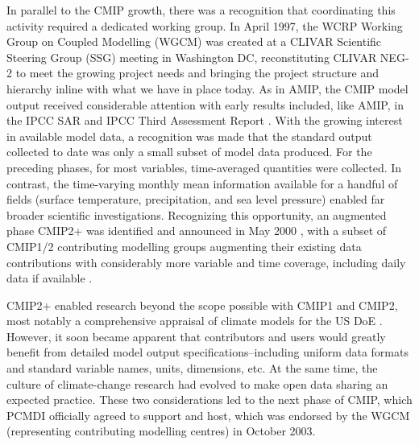 \documentclass[gmd, preprint]{copernicus}
\begin{document}
In parallel to the CMIP growth, there was a recognition that coordinating this activity required a dedicated working group. In April 1997, the WCRP Working Group on Coupled Modelling (WGCM) was created at a CLIVAR Scientific Steering Group (SSG) meeting in Washington DC, reconstituting CLIVAR NEG-2 to meet the growing project needs \citep{detemmerman_clivar_1997} and bringing the project structure and hierarchy inline with what we have in place today. As in AMIP, the CMIP model output received considerable attention with early results included, like AMIP, in the IPCC SAR \citep{gates_climate_1996} and IPCC Third Assessment Report \citep[TAR;][]{mcavaney_model_2001}. With the growing interest in available model data, a recognition was made that the standard output collected to date was only a small subset of model data produced. For the preceding phases, for most variables, time-averaged quantities were collected. In contrast, the time-varying monthly mean information available for a handful of fields (surface temperature, precipitation, and sea level pressure) enabled far broader scientific investigations. Recognizing this opportunity, an augmented phase CMIP2+ was identified and announced in May 2000 \citep{villwock_6th_2003, meehl_cmip_2003, meehl_overview_2005}, with a subset of CMIP1/2 contributing modelling groups augmenting their existing data contributions with considerably more variable and time coverage, including daily data if available \citep{achutarao_pcmdi_2004}.

CMIP2+ enabled research beyond the scope possible with CMIP1 and CMIP2, most notably a comprehensive appraisal of climate models for the US DoE \citep{achutarao_pcmdi_2004}. However, it soon became apparent that contributors and users would greatly benefit from detailed model output specifications--including uniform data formats and standard variable names, units, dimensions, etc. At the same time, the culture of climate-change research had evolved to make open data sharing an expected practice. These two considerations led to the next phase of CMIP, which PCMDI officially agreed to support and host, which was endorsed by the WGCM (representing contributing modelling centres) in October 2003.
\end{document}
